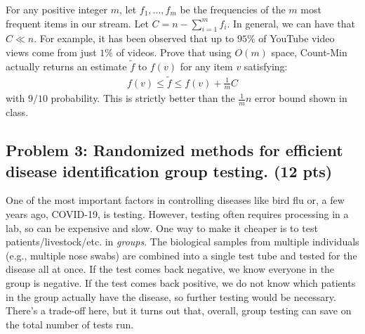 \documentclass[10pt]{article}
\begin{document}
For any positive integer $m$, let $f_1, \ldots, f_{m}$ be the frequencies of the $m$ most frequent items in our stream. Let $C = n - \sum_{i=1}^{m} f_i$. In general, we can have that $C \ll n$. For example, it has been observed that up to $95\%$ of YouTube video views come from just $1\%$ of videos. 
Prove that using $O(m)$ space,  Count-Min actually returns an estimate $\tilde{f}$ to $f(v)$ for any item $v$ satisfying:
\begin{align*}
	f(v) \leq \tilde{f} \leq f(v) + \frac{1}{m} C
\end{align*}
with $9/10$ probability. This is strictly better than the $\frac{1}{m} n$ error bound shown in class. 


\subsection{Problem 3: Randomized methods for efficient disease identification group testing. (12 pts)}
One of the most important factors in controlling diseases like bird flu or, a few years ago, COVID-19, is testing. However, testing often requires processing in a lab, so can be expensive and slow. One way to make it cheaper is to test patients/livestock/etc. in \emph{groups}. The biological samples from multiple individuals (e.g., multiple nose swabs) are combined into a single test tube and tested for the disease all at once. If the test comes back negative, we know everyone in the group is negative. If the test comes back positive, we do not know which patients in the group actually have the disease, so further testing would be necessary. There's a trade-off here, but it turns out that, overall, group testing can save on the total number of tests run. 
\end{document}
